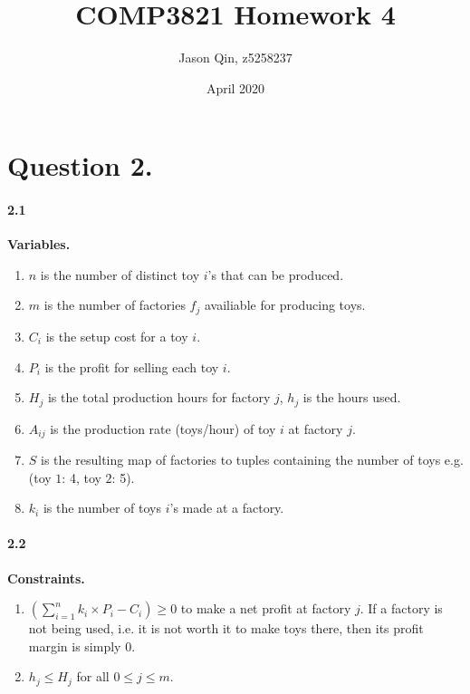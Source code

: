 \documentclass{article}
\title{COMP3821 Homework 4}
\author{Jason Qin, z5258237}
\date{April 2020}
\begin{document}
\maketitle

\section*{Question 2.}
\paragraph{2.1} \textbf{Variables.} \\

\noindent
\begin{enumerate}
    \item $n$ is the number of distinct toy $i$'s that can be produced. \\
    \item $m$ is the number of factories $f_j$ availiable for producing toys. \\
    \item $C_i$ is the setup cost for a toy $i$. \\
    \item $P_i$ is the profit for selling each toy $i$. \\
    \item $H_j$ is the total production hours for factory $j$, $h_j$ is the hours used. \\
    \item $A_{ij}$ is the production rate (toys/hour) of toy $i$ at factory $j$. \\
    \item $S$ is the resulting map of factories to tuples containing the number of toys e.g. (toy $1$: 4, toy $2$: 5). \\
    \item $k_i$ is the number of toys $i$'s made at a factory.
\end{enumerate}

\paragraph*{2.2} \textbf{Constraints.} \\

\noindent
\begin{enumerate}
    \item $(\sum_{i=1}^{n}k_i \times P_i - C_i) \geq 0$ to make a net profit at factory $j$. If a factory is not being used, i.e. it is not worth it to make toys there, then its profit margin is simply $0$.\\
    \item $h_j \leq H_j$ for all $0 \leq j \leq m$.
\end{enumerate}
\end{document}
